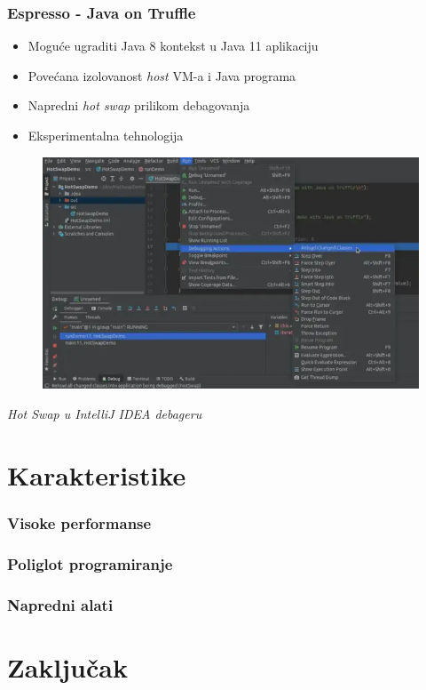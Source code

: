 \documentclass{beamer}
\begin{document}
	\begin{frame}
		\frametitle{Espresso - Java on Truffle}

		\begin{flushleft}
			\begin{itemize}
				\item Moguće ugraditi Java 8 kontekst u Java 11 aplikaciju
				\item Povećana izolovanost \emph{host} VM-a i Java programa
				\item Napredni \emph{hot swap} prilikom debagovanja
				\item Eksperimentalna tehnologija
			\end{itemize}
		\end{flushleft}


		\begin{figure}
			\begin{center}
				\includegraphics[width=0.5\linewidth]{imgs/hotswap.png}	
			\end{center} 
		\end{figure}

		\center	
		\textit{Hot Swap u IntelliJ IDEA debageru}

	\end{frame}
	
		
	\section{Karakteristike}
	
	\begin{frame}
		\frametitle{Visoke performanse}
	\end{frame}	

	\begin{frame}
		\frametitle{Poliglot programiranje}
	\end{frame}	

	\begin{frame}
		\frametitle{Napredni alati}
	\end{frame}	

	\section{Zaključak}
	
\end{document}
